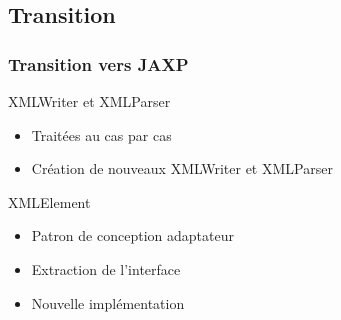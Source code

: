 \subsection{Transition}
\begin{frame}
\frametitle{Transition vers JAXP}
\begin{minipage}[c]{\linewidth}
	\begin{beamerboxesrounded}[shadow=true]{XMLWriter et XMLParser}
		\begin{itemize}
			\item Traitées au cas par cas
			\item Création de nouveaux XMLWriter et XMLParser
		\end{itemize}
	\end{beamerboxesrounded}
\end{minipage}
\vfill
\begin{minipage}[c]{\linewidth}
	\begin{beamerboxesrounded}[shadow=true]{XMLElement}
		\begin{itemize}
			\item Patron de conception adaptateur
			\item Extraction de l'interface
			\item Nouvelle implémentation
		\end{itemize}
	\end{beamerboxesrounded}
\end{minipage}
\vfill
\end{frame}
